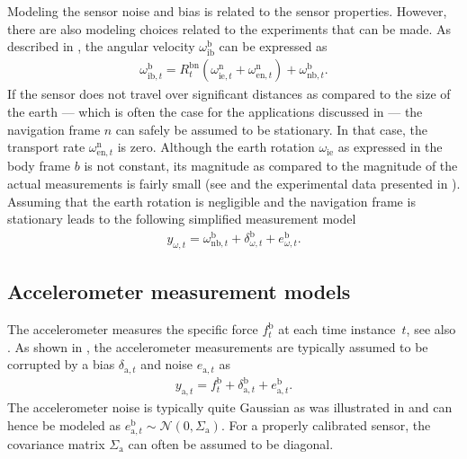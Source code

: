 Modeling the sensor noise and bias is related to the sensor properties. However, there are also modeling choices related to the experiments that can be made. 
As described in , the angular velocity $\omega_{\text{ib}}^\text{b}$ can be expressed as
\begin{align}
\omega_{\text{ib},t}^\text{b}
= R^{\text{bn}}_t \left(
\omega_{\text{ie},t}^\text{n} +
\omega_{\text{en},t}^\text{n} \right)
+ \omega_{\text{nb},t}^\text{b}.
\end{align}
If the sensor does not travel over significant distances as compared to the size of the earth --- which is often the case for the applications discussed in  --- the navigation frame $n$ can safely be assumed to be stationary. In that case, the transport rate $\omega_{\text{en},t}^\text{n}$ is zero. Although the earth rotation $\omega_{\text{ie}}$ as expressed in the body frame $b$ is not constant, its magnitude as compared to the magnitude of the actual measurements is fairly small (see  and the experimental data presented in ). Assuming that the earth rotation is negligible and the navigation frame is stationary leads to the following simplified measurement model
\begin{align}
\label{eq:models-gyrMeasModel}
y_{\omega,t} = \omega_{\text{nb},t}^\text{b} + \delta_{\omega,t}^\text{b} + e_{\omega,t}^\text{b}.
\end{align}

\subsection{Accelerometer measurement models}
\label{sec:models-accMeasModel}
The accelerometer measures the specific force $f^\text{b}_t$ at each time instance~$t$, see also . As shown in , the accelerometer measurements are typically assumed to be corrupted by a bias $\delta_{\text{a},t}$ and noise $e_{\text{a},t}$ as
\begin{align}
\label{eq:models-accMeasModelGeneral}
y_{\text{a},t} 
= f^\text{b}_t 
+ \delta_{\text{a},t}^\text{b}
+ e_{\text{a},t}^\text{b}.
\end{align}
The accelerometer noise is typically quite Gaussian as was illustrated in  and can hence be modeled as $e_{\text{a},t}^\text{b} \sim \mathcal{N}(0, \Sigma_\text{a})$. For a properly calibrated sensor, the covariance matrix $\Sigma_\text{a}$ can often be assumed to be diagonal. 

